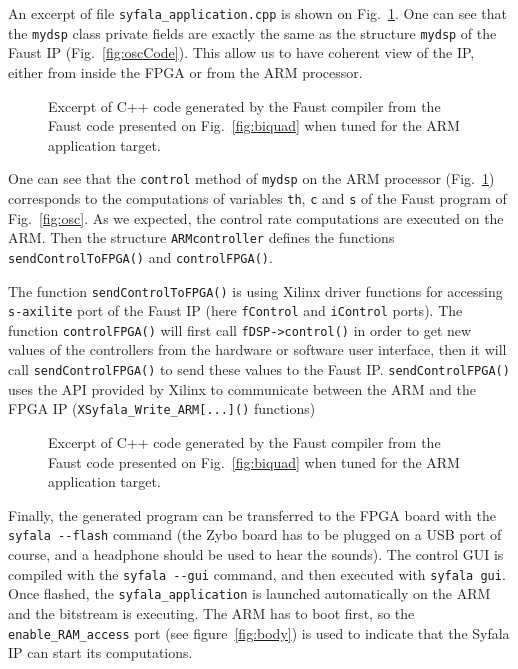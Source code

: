 An excerpt of file {\tt syfala\_application.cpp} is shown on Fig.~\ref{fig:oscARM}. One can see that the {\tt mydsp} class private fields are exactly the same as the structure {\tt mydsp} of the Faust IP (Fig.~\ref{fig:oscCode}). This allow us to have coherent view of the IP, either from inside the FPGA or from the ARM processor. 

\begin{figure}[ht]
  \begin{boxedminipage}{\columnwidth}
    \tiny
    
  \end{boxedminipage}
  \caption{Excerpt of C++ code generated by the Faust compiler from the Faust code presented on Fig.~\ref{fig:biquad} when tuned for the ARM application target.}
  \label{fig:oscARM}
\end{figure}


One can see that the {\tt control} method of {\tt mydsp} on the ARM processor (Fig.~\ref{fig:oscARM}) corresponds to the computations of variables {\tt th}, {\tt c} and {\tt s} of the Faust program of Fig.~\ref{fig:osc}. As we expected, the control rate computations are executed on the ARM. Then the structure {\tt ARMcontroller} defines the functions {\tt sendControlToFPGA()} and {\tt controlFPGA()}.

The function {\tt sendControlToFPGA()} is using Xilinx driver functions for accessing {\tt s-axilite} port of the Faust IP (here {\tt fControl} and {\tt iControl} ports). The function {\tt controlFPGA()}  will first call {\tt \verb#fDSP->control()#} in order to get new values of the controllers from the hardware or software user interface, then it will call  {\tt sendControlFPGA()} to send these values to the Faust IP. {\tt sendControlFPGA()} uses the API provided by Xilinx to communicate between the ARM and the FPGA IP (\verb#XSyfala_Write_ARM[...]()# functions)

\begin{figure}[ht]
  \begin{boxedminipage}{\columnwidth}
    \tiny
    
  \end{boxedminipage}
  \caption{Excerpt of C++ code generated by the Faust compiler from the Faust code presented on Fig.~\ref{fig:biquad} when tuned for the ARM application target.}
  \label{fig:oscARM2}
\end{figure}

Finally, the generated program can be transferred to the FPGA board with the  \verb#syfala --flash# command (the Zybo board has to be plugged on a USB port of course, and a headphone should be used to hear the sounds). The control GUI is compiled with the \verb#syfala --gui# command, and then executed with \verb#syfala gui#. Once flashed, the {\tt syfala\_application} is launched automatically on the ARM and the bitstream is executing. The ARM has to boot first, so the {\tt enable\_RAM\_access} port (see figure~\ref{fig:body}) is used to indicate that the Syfala IP can start its computations.



